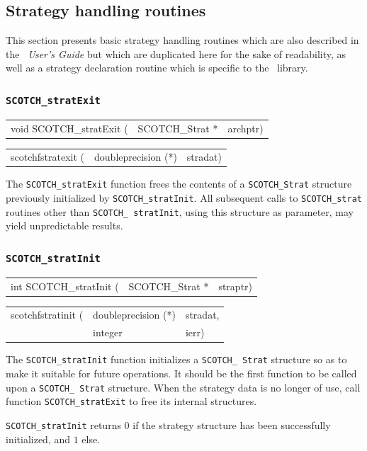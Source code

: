 \subsection{Strategy handling routines}
\label{sec-lib-func-strat}

This section presents basic strategy handling routines which are also
described in the {\it\scotch\ User's Guide} but which are duplicated
here for the sake of readability, as well as a strategy declaration
routine which is specific to the \ptscotch\ library.

\subsubsection{{\tt SCOTCH\_stratExit}}

\begin{itemize}
\progsyn

{\tt\begin{tabular}{l@{}ll}
void SCOTCH\_stratExit ( & SCOTCH\_Strat * & archptr)
\end{tabular}}

{\tt\begin{tabular}{l@{}ll}
scotchfstratexit ( & doubleprecision (*) & stradat)
\end{tabular}}

\progdes

The {\tt SCOTCH\_stratExit} function frees the contents of a
{\tt SCOTCH\_\lbt Strat} structure previously initialized by
{\tt SCOTCH\_\lbt strat\lbt Init}. All subsequent calls to
{\tt SCOTCH\_\lbt strat} routines other than {\tt SCOTCH\_\lbt
strat\lbt Init}, using this structure as parameter, may yield
unpredictable results.
\end{itemize}

\subsubsection{{\tt SCOTCH\_stratInit}}

\begin{itemize}
\progsyn

{\tt\begin{tabular}{l@{}ll}
int SCOTCH\_stratInit ( & SCOTCH\_Strat * & straptr)
\end{tabular}}

{\tt\begin{tabular}{l@{}ll}
scotchfstratinit ( & doubleprecision (*) & stradat, \\
                   & integer             & ierr)
\end{tabular}}

\progdes

The {\tt SCOTCH\_stratInit} function initializes a {\tt SCOTCH\_\lbt
Strat} structure so as to make it suitable for future operations. It
should be the first function to be called upon a {\tt SCOTCH\_\lbt
Strat} structure. When the strategy data is no longer of use, call
function {\tt SCOTCH\_\lbt strat\lbt Exit} to free its internal
structures.

\progret

{\tt SCOTCH\_stratInit} returns $0$ if the strategy structure has been
successfully initialized, and $1$ else.
\end{itemize}

